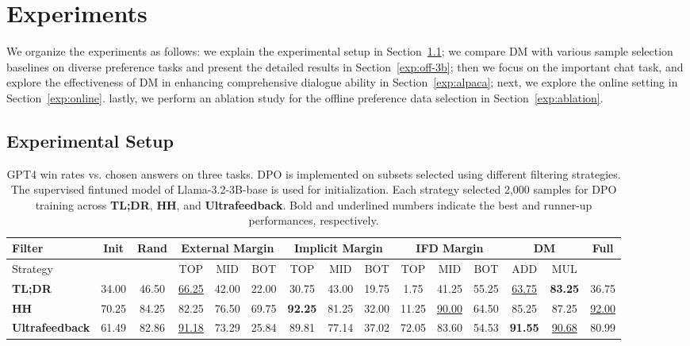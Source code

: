 \section{Experiments}
\label{sec:experiment}

We organize the experiments as follows: we explain the experimental setup in Section~\ref{exp:setting}; we compare DM with various sample selection baselines on diverse preference tasks and present the detailed results in Section~\ref{exp:off-3b}; then we focus on the important chat task, and explore the effectiveness of DM in enhancing comprehensive dialogue ability in Section~\ref{exp:alpaca}; next, we explore the online setting in Section~\ref{exp:online}.
lastly, we perform an ablation study for the offline preference data selection in Section~\ref{exp:ablation}.

\subsection{Experimental Setup}
\label{exp:setting}

\begin{table*}[t]
    \centering
    \setlength{\abovecaptionskip}{0.1cm}
    \setlength{\belowcaptionskip}{0cm}
    \setlength{\tabcolsep}{5pt} 
    \renewcommand{\arraystretch}{1.3} 
    \caption{GPT4 win rates vs. chosen answers on three tasks. DPO is implemented on subsets selected using different filtering strategies. The supervised fintuned model of Llama-3.2-3B-base is used for initialization. Each strategy selected 2,000 samples for DPO training across \textbf{TL;DR}, \textbf{HH}, and \textbf{Ultrafeedback}. Bold and underlined numbers indicate the best and runner-up performances, respectively.}
    \label{tab:3b-test}
    \small
    \begin{tabular}{l|cc|ccc|ccc|ccc|cc|c}
    \toprule
    Filter & Init & Rand & \multicolumn{3}{c|}{External Margin} & \multicolumn{3}{c|}{Implicit Margin} & \multicolumn{3}{c|}{IFD Margin} & \multicolumn{2}{c|}{DM} & Full  \\
    \midrule
    Strategy&  &  & TOP & MID & BOT & TOP & MID & BOT & TOP & MID & BOT & ADD & MUL & \\
    \midrule
    \textbf{TL;DR} & 34.00 & 46.50 & \underline{66.25} & 42.00 & 22.00 & 30.75 & 43.00 & 19.75 & 1.75 & 41.25 & 55.25 & \underline{63.75} & \textbf{83.25} & 36.75 \\
    \textbf{HH} & 70.25 & 84.25 & 82.25 & 76.50 & 69.75 & \textbf{92.25} & 81.25 & 32.00 & 11.25 & \underline{90.00} & 64.50 & 85.25 & 87.25 & \underline{92.00} \\
    \textbf{Ultrafeedback} & 61.49 & 82.86 & \underline{91.18} & 73.29 & 25.84 & 89.81 & 77.14 & 37.02 & 72.05 & 83.60 & 54.53 & \textbf{91.55} & \underline{90.68} & 80.99\\
    
         \bottomrule
    \end{tabular}
\end{table*}

